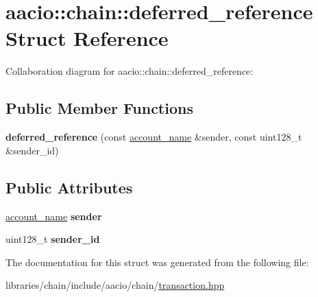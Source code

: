 \hypertarget{structaacio_1_1chain_1_1deferred__reference}{}\section{aacio\+:\+:chain\+:\+:deferred\+\_\+reference Struct Reference}
\label{structaacio_1_1chain_1_1deferred__reference}


Collaboration diagram for aacio\+:\+:chain\+:\+:deferred\+\_\+reference\+:
\subsection*{Public Member Functions}
\begin{DoxyCompactItemize}
\item 
\mbox{\label{structaacio_1_1chain_1_1deferred__reference_ad10642b312ea3eb3ec58cc3091c75e78}} 
{\bfseries deferred\+\_\+reference} (const \mbox{\hyperlink{structaacio_1_1chain_1_1name}{account\+\_\+name}} \&sender, const uint128\+\_\+t \&sender\+\_\+id)
\end{DoxyCompactItemize}
\subsection*{Public Attributes}
\begin{DoxyCompactItemize}
\item 
\mbox{\label{structaacio_1_1chain_1_1deferred__reference_a7bcbcd7256988f2335811413d14ecd38}} 
\mbox{\hyperlink{structaacio_1_1chain_1_1name}{account\+\_\+name}} {\bfseries sender}
\item 
\mbox{\label{structaacio_1_1chain_1_1deferred__reference_acd7a09612926415532c9a3377e277305}} 
uint128\+\_\+t {\bfseries sender\+\_\+id}
\end{DoxyCompactItemize}


The documentation for this struct was generated from the following file\+:\begin{DoxyCompactItemize}
\item 
libraries/chain/include/aacio/chain/\mbox{\hyperlink{libraries_2chain_2include_2aacio_2chain_2transaction_8hpp}{transaction.\+hpp}}\end{DoxyCompactItemize}

